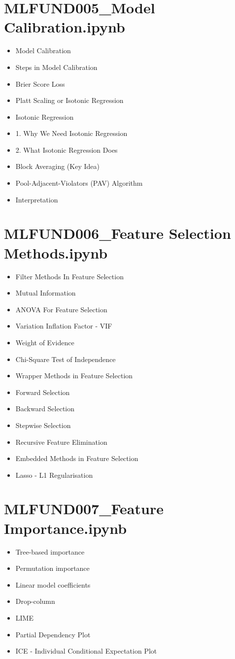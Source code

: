 \documentclass[11pt]{article}
\begin{document}
\section*{MLFUND005\_Model Calibration.ipynb}
\begin{itemize}
\item Model Calibration
\item Steps in Model Calibration
\item Brier Score Loss
\item Platt Scaling or Isotonic Regression
\item Isotonic Regression
\item 1. Why We Need Isotonic Regression
\item 2. What Isotonic Regression Does
\item Block Averaging (Key Idea)
\item Pool-Adjacent-Violators (PAV) Algorithm
\item Interpretation
\end{itemize}
\section*{MLFUND006\_Feature Selection Methods.ipynb}
\begin{itemize}
\item Filter Methods In Feature Selection
\item Mutual Information
\item ANOVA For Feature Selection
\item Variation Inflation Factor - VIF
\item Weight of Evidence
\item Chi-Square Test of Independence
\item Wrapper Methods in Feature Selection
\item Forward Selection
\item Backward Selection
\item Stepwise Selection
\item Recursive Feature Elimination
\item Embedded Methods in Feature Selection
\item Lasso - L1 Regularisation
\end{itemize}
\section*{MLFUND007\_Feature Importance.ipynb}
\begin{itemize}
\item Tree-based importance
\item Permutation importance
\item Linear model coefficients
\item Drop-column
\item LIME
\item Partial Dependency Plot
\item ICE - Individual Conditional Expectation Plot
\end{itemize}
\end{document}
